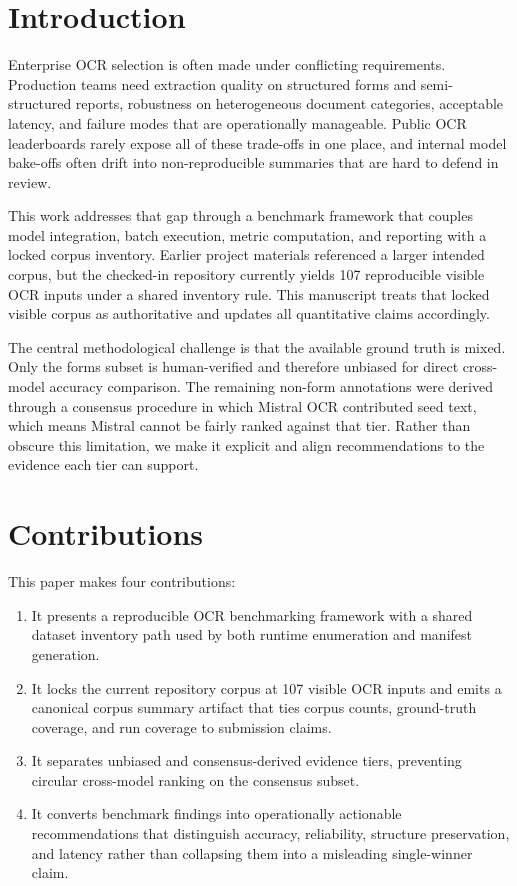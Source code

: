\documentclass[conference]{IEEEtran}
\begin{document}
\section{Introduction}

Enterprise OCR selection is often made under conflicting requirements. Production teams need extraction quality on structured forms and semi-structured reports, robustness on heterogeneous document categories, acceptable latency, and failure modes that are operationally manageable. Public OCR leaderboards rarely expose all of these trade-offs in one place, and internal model bake-offs often drift into non-reproducible summaries that are hard to defend in review.

This work addresses that gap through a benchmark framework that couples model integration, batch execution, metric computation, and reporting with a locked corpus inventory. Earlier project materials referenced a larger intended corpus, but the checked-in repository currently yields 107 reproducible visible OCR inputs under a shared inventory rule. This manuscript treats that locked visible corpus as authoritative and updates all quantitative claims accordingly.

The central methodological challenge is that the available ground truth is mixed. Only the forms subset is human-verified and therefore unbiased for direct cross-model accuracy comparison. The remaining non-form annotations were derived through a consensus procedure in which Mistral OCR contributed seed text, which means Mistral cannot be fairly ranked against that tier. Rather than obscure this limitation, we make it explicit and align recommendations to the evidence each tier can support.

\section{Contributions}

This paper makes four contributions:
\begin{enumerate}
    \item It presents a reproducible OCR benchmarking framework with a shared dataset inventory path used by both runtime enumeration and manifest generation.
    \item It locks the current repository corpus at 107 visible OCR inputs and emits a canonical corpus summary artifact that ties corpus counts, ground-truth coverage, and run coverage to submission claims.
    \item It separates unbiased and consensus-derived evidence tiers, preventing circular cross-model ranking on the consensus subset.
    \item It converts benchmark findings into operationally actionable recommendations that distinguish accuracy, reliability, structure preservation, and latency rather than collapsing them into a misleading single-winner claim.
\end{enumerate}
\end{document}

